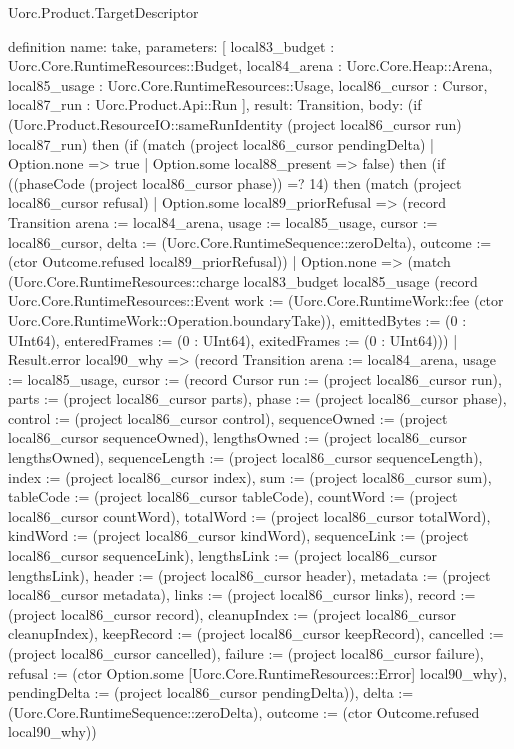 \begin{lexlean}{Uorc.Product.TargetDescriptor}
\begin{semanticmodule}
definition{
  name: take,
  parameters: [
    local83_budget : Uorc.Core.RuntimeResources::Budget,
    local84_arena : Uorc.Core.Heap::Arena,
    local85_usage : Uorc.Core.RuntimeResources::Usage,
    local86_cursor : Cursor,
    local87_run : Uorc.Product.Api::Run
  ],
  result: Transition,
  body: (if (Uorc.Product.ResourceIO::sameRunIdentity (project local86_cursor run) local87_run) then (if (match (project local86_cursor pendingDelta)
    | Option.none => true
    | Option.some local88_present => false) then (if ((phaseCode (project local86_cursor phase)) =? 14) then (match (project local86_cursor refusal)
    | Option.some local89_priorRefusal => (record Transition {arena := local84_arena, usage := local85_usage, cursor := local86_cursor, delta := (Uorc.Core.RuntimeSequence::zeroDelta), outcome := (ctor Outcome.refused local89_priorRefusal)})
    | Option.none => (match (Uorc.Core.RuntimeResources::charge local83_budget local85_usage (record Uorc.Core.RuntimeResources::Event {work := (Uorc.Core.RuntimeWork::fee (ctor Uorc.Core.RuntimeWork::Operation.boundaryTake)), emittedBytes := (0 : UInt64), enteredFrames := (0 : UInt64), exitedFrames := (0 : UInt64)}))
      | Result.error local90_why => (record Transition {arena := local84_arena, usage := local85_usage, cursor := (record Cursor {run := (project local86_cursor run), parts := (project local86_cursor parts), phase := (project local86_cursor phase), control := (project local86_cursor control), sequenceOwned := (project local86_cursor sequenceOwned), lengthsOwned := (project local86_cursor lengthsOwned), sequenceLength := (project local86_cursor sequenceLength), index := (project local86_cursor index), sum := (project local86_cursor sum), tableCode := (project local86_cursor tableCode), countWord := (project local86_cursor countWord), totalWord := (project local86_cursor totalWord), kindWord := (project local86_cursor kindWord), sequenceLink := (project local86_cursor sequenceLink), lengthsLink := (project local86_cursor lengthsLink), header := (project local86_cursor header), metadata := (project local86_cursor metadata), links := (project local86_cursor links), record := (project local86_cursor record), cleanupIndex := (project local86_cursor cleanupIndex), keepRecord := (project local86_cursor keepRecord), cancelled := (project local86_cursor cancelled), failure := (project local86_cursor failure), refusal := (ctor Option.some [Uorc.Core.RuntimeResources::Error] local90_why), pendingDelta := (project local86_cursor pendingDelta)}), delta := (Uorc.Core.RuntimeSequence::zeroDelta), outcome := (ctor Outcome.refused local90_why)})
}
\end{semanticmodule}
\end{lexlean}
